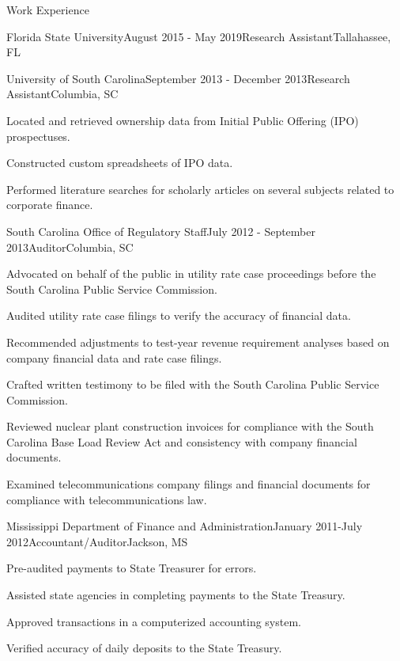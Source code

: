 \documentclass{resume} %
\begin{document}
\begin{rSection}{Work Experience}
\begin{rSubsection}{Florida State University}{August 2015 - May 2019}{Research Assistant}{Tallahassee, FL}
\end{rSubsection}
    


\begin{rSubsection}{University of South Carolina}{September 2013 - December 2013}{Research Assistant}{Columbia, SC}
    \item Located and retrieved ownership data from Initial Public Offering (IPO) prospectuses.
    \item Constructed custom spreadsheets of IPO data.
    \item Performed literature searches for scholarly articles on several subjects related to corporate finance.
\end{rSubsection}

\begin{rSubsection}{South Carolina Office of Regulatory Staff}{July 2012 - September 2013}{Auditor}{Columbia, SC}
    \item Advocated on behalf of the public in utility rate case proceedings before the South Carolina Public Service Commission.
    \item Audited utility rate case filings to verify the accuracy of financial data.
    \item Recommended adjustments to test-year revenue requirement analyses based on company financial data and rate case filings.
    \item Crafted written testimony to be filed with the South Carolina Public Service Commission.
    \item Reviewed nuclear plant construction invoices for compliance with the South Carolina Base Load Review Act and consistency with company financial documents.
    \item Examined telecommunications company filings and financial documents for compliance with telecommunications law.

\end{rSubsection}

\begin{rSubsection}{Mississippi Department of Finance and Administration}{January 2011-July 2012}{Accountant/Auditor}{Jackson, MS}
    \item Pre-audited payments to State Treasurer for errors.
    \item Assisted state agencies in completing payments to the State Treasury.
    \item Approved transactions in a computerized accounting system.
    \item Verified accuracy of daily deposits to the State Treasury.


\end{rSubsection}
\end{rSection}
\end{document}
